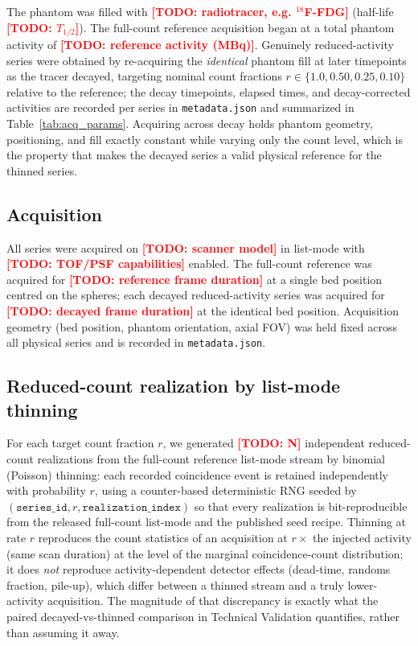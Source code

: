 \documentclass[twoside,11pt]{article}
\newcommand{\todo}[1]{\textcolor{red}{\textbf{[TODO: #1]}}}
\begin{document}
The phantom was filled with \todo{radiotracer, e.g. $^{18}$F-FDG}
(half-life \todo{$T_{1/2}$}). The full-count reference acquisition began at a total
phantom activity of \todo{reference activity (MBq)}. Genuinely reduced-activity
series were obtained by re-acquiring the \emph{identical} phantom fill at later
timepoints as the tracer decayed, targeting nominal count fractions
$r \in \{1.0, 0.50, 0.25, 0.10\}$ relative to the reference; the decay timepoints,
elapsed times, and decay-corrected activities are recorded per series in
\texttt{metadata.json} and summarized in Table~\ref{tab:acq_params}. Acquiring
across decay holds phantom geometry, positioning, and fill exactly constant while
varying only the count level, which is the property that makes the decayed series a
valid physical reference for the thinned series.

\subsection*{Acquisition}

All series were acquired on \todo{scanner model} in list-mode with
\todo{TOF/PSF capabilities} enabled. The full-count reference was acquired for
\todo{reference frame duration} at a single bed position centred on the spheres;
each decayed reduced-activity series was acquired for \todo{decayed frame duration}
at the identical bed position. Acquisition geometry (bed position, phantom
orientation, axial FOV) was held fixed across all physical series and is recorded
in \texttt{metadata.json}.

\subsection*{Reduced-count realization by list-mode thinning}

For each target count fraction $r$, we generated \todo{N} independent reduced-count
realizations from the full-count reference list-mode stream by binomial (Poisson)
thinning: each recorded coincidence event is retained independently with
probability $r$, using a counter-based deterministic RNG seeded by
$(\texttt{series\_id}, r, \texttt{realization\_index})$ so that every realization is
bit-reproducible from the released full-count list-mode and the published seed
recipe. Thinning at rate $r$ reproduces the count statistics of an acquisition at
$r\times$ the injected activity (same scan duration) at the level of the marginal
coincidence-count distribution; it does \emph{not} reproduce activity-dependent
detector effects (dead-time, randoms fraction, pile-up), which differ between a
thinned stream and a truly lower-activity acquisition. The magnitude of that
discrepancy is exactly what the paired decayed-vs-thinned comparison in Technical
Validation quantifies, rather than assuming it away.
\end{document}
